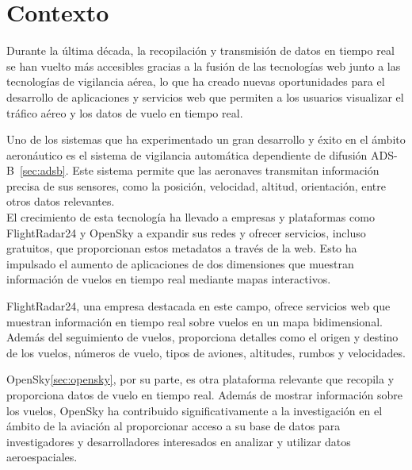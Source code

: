 \documentclass[a4paper, 11pt]{book}
\begin{document}
\section{Contexto}
\label{sec:contexto}
Durante la última década, la recopilación y transmisión de datos en tiempo real se han vuelto más accesibles gracias a la fusión de las tecnologías web junto a las tecnologías de vigilancia aérea, lo que ha creado nuevas oportunidades para el desarrollo de aplicaciones y servicios web que permiten a los usuarios visualizar el tráfico aéreo y los datos de vuelo en tiempo real.

Uno de los sistemas que ha experimentado un gran desarrollo y éxito en el ámbito aeronáutico es el sistema de vigilancia automática dependiente de difusión \textsc{ADS-B}~\ref{sec:adsb}. Este sistema permite que las aeronaves transmitan información precisa de sus sensores, como la posición, velocidad, altitud, orientación, entre otros datos relevantes. \\
El crecimiento de esta tecnología ha llevado a empresas y plataformas como FlightRadar24 y OpenSky a expandir sus redes y ofrecer servicios, incluso gratuitos, que proporcionan estos metadatos a través de la web. Esto ha impulsado el aumento de aplicaciones de dos dimensiones que muestran información de vuelos en tiempo real mediante mapas interactivos.

FlightRadar24, una empresa destacada en este campo, ofrece servicios web que muestran información en tiempo real sobre vuelos en un mapa bidimensional. Además del seguimiento de vuelos, proporciona detalles como el origen y destino de los vuelos, números de vuelo, tipos de aviones, altitudes, rumbos y velocidades.

OpenSky\ref{sec:opensky}, por su parte, es otra plataforma relevante que recopila y proporciona datos de vuelo en tiempo real. Además de mostrar información sobre los vuelos, OpenSky ha contribuido significativamente a la investigación en el ámbito de la aviación al proporcionar acceso a su base de datos para investigadores y desarrolladores interesados en analizar y utilizar datos aeroespaciales.


\newpage
\end{document}

